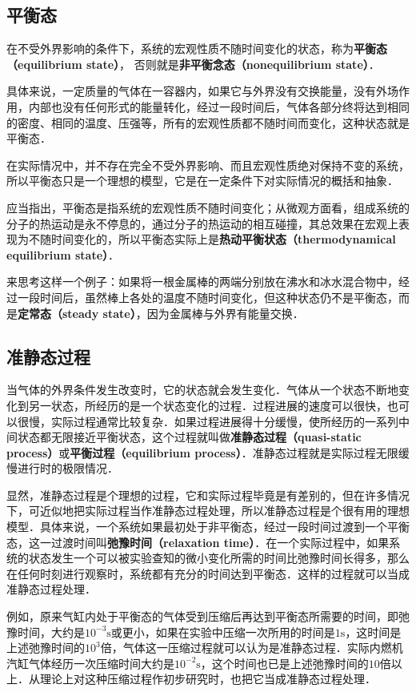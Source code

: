 
\subsection{平衡态}

在不受外界影响的条件下，系统的宏观性质不随时间变化的状态，称为\textbf{平衡态（equilibrium state）}， 否则就是\textbf{非平衡念态（nonequilibrium state）}．

具体来说，一定质量的气体在一容器内，如果它与外界没有交换能量，没有外场作用，内部也没有任何形式的能量转化，经过一段时间后，气体各部分终将达到相同的密度、相同的温度、压强等，所有的宏观性质都不随时间而变化，这种状态就是平衡态．

在实际情况中，并不存在完全不受外界影响、而且宏观性质绝对保持不变的系统，所以平衡态只是一个理想的模型，它是在一定条件下对实际情况的概括和抽象．

应当指出，平衡态是指系统的宏观性质不随时间变化；从微观方面看，组成系统的分子的热运动是永不停息的，通过分子的热运动的相互碰撞，其总效果在宏观上表现为不随时间变化的，所以平衡态实际上是\textbf{热动平衡状态（thermodynamical equilibrium state）}．

来思考这样一个例子：如果将一根金属棒的两端分别放在沸水和冰水混合物中，经过一段时间后，虽然棒上各处的温度不随时间变化，但这种状态仍不是平衡态，而是\textbf{定常态（steady state）}，因为金属棒与外界有能量交换．

\subsection{准静态过程}

当气体的外界条件发生改变时，它的状态就会发生变化．气体从一个状态不断地变化到另一状态，所经历的是一个状态变化的过程．过程进展的速度可以很快，也可以很慢，实际过程通常比较复杂．如果过程进展得十分缓慢，使所经历的一系列中间状态都无限接近平衡状态，这个过程就叫做\textbf{准静态过程（quasi-static process）}或\textbf{平衡过程（equilibrium process）}．准静态过程就是实际过程无限缓慢进行时的极限情况．

显然，准静态过程是个理想的过程，它和实际过程毕竟是有差别的，但在许多情况下，可近似地把实际过程当作准静态过程处理，所以准静态过程是个很有用的理想模型．具体来说，一个系统如果最初处于非平衡态，经过一段时间过渡到一个平衡态，这一过渡时间叫\textbf{弛豫时间（relaxation time）}．在一个实际过程中，如果系统的状态发生一个可以被实验查知的微小变化所需的时间比弛豫时间长得多，那么在任何时刻进行观察时，系统都有充分的时间达到平衡态．这样的过程就可以当成准静态过程处理．

例如，原来气缸内处于平衡态的气体受到压缩后再达到平衡态所需要的时间，即弛豫时间，大约是$10^{-3}\mathrm s$或更小，如果在实验中压缩一次所用的时间是$1\mathrm s$，这时间是上述弛豫时间的$10^3$倍，气体这一压缩过程就可以认为是准静态过程．实际内燃机汽缸气体经历一次压缩时间大约是$10^{-2}\mathrm s$，这个时间也已是上述弛豫时间的$10$倍以上．从理论上对这种压缩过程作初步研究时，也把它当成准静态过程处理．
